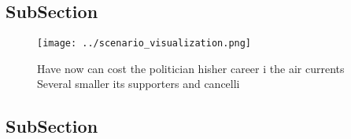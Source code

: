 \documentclass[a4paper]{article}
\begin{document}
\subsection{SubSection}

\begin{figure}
\centering
\texttt{[image: ../scenario\_visualization.png]}
\caption{Have now can cost the politician hisher career i the air currents Several smaller its supporters and cancelli
}
\end{figure}
 
\subsection{SubSection}
\end{document}
